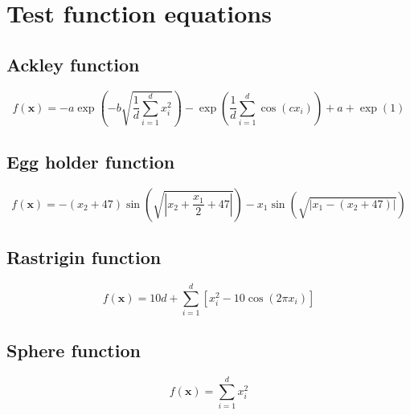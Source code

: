 \label{app_c}
\chapter{Test function equations}
\section{Ackley function}
\begin{equation}
f(\mathbf{x})=-a \exp \left(-b \sqrt{\frac{1}{d} \sum_{i=1}^{d} x_{i}^{2}}\right)-\exp \left(\frac{1}{d} \sum_{i=1}^{d} \cos \left(c x_{i}\right)\right)+a+\exp (1)
\label{Ackley function}
\end{equation}

\section{Egg holder function}
\begin{equation}
f(\mathbf{x})=-\left(x_{2}+47\right) \sin \left(\sqrt{\left|x_{2}+\frac{x_{1}}{2}+47\right|}\right)-x_{1} \sin (\sqrt{\left|x_{1}-\left(x_{2}+47\right)\right|})
\label{Egg holder function}
\end{equation}

\section{Rastrigin function}
\begin{equation}
f(\mathbf{x})=10 d+\sum_{i=1}^{d}\left[x_{i}^{2}-10 \cos \left(2 \pi x_{i}\right)\right]
\label{Rastrigin function}
\end{equation}

\section{Sphere function}
\begin{equation}
f(\mathbf{x})=\sum_{i=1}^{d} x_{i}^{2}
\label{Sphere function}
\end{equation}